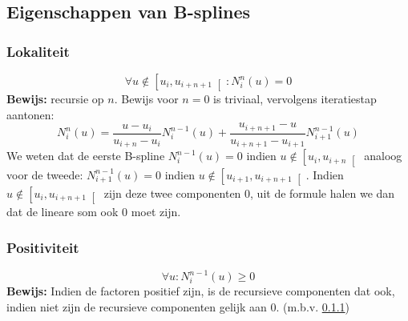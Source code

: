 \documentclass[a4paper,titlepage]{article}
\newcommand{\brak}[1]{\left(#1\right)}
\newcommand{\rinva}[1]{\left[#1\right[}
\begin{document}
\subsection{Eigenschappen van B-splines}
\subsubsection{Lokaliteit}
\label{subsec:splinLok}
\begin{equation}
\forall u\notin\rinva{u_i,u_{i+n+1}}:N_i^n\brak{u}=0
\end{equation}
\textbf{Bewijs: } recursie op $n$. Bewijs voor $n=0$ is triviaal, vervolgens iteratiestap aantonen:
\begin{equation}
N_i^n\brak{u}=\displaystyle\frac{u-u_i}{u_{i+n}-u_i}N_i^{n-1}\brak{u}+\displaystyle\frac{u_{i+n+1}-u}{u_{i+n+1}-u_{i+1}}N_{i+1}^{n-1}\brak{u}
\end{equation}
We weten dat de eerste B-spline $N_i^{n-1}\brak{u}=0$ indien $u\notin\rinva{u_i,u_{i+n}}$ analoog voor de tweede: $N_{i+1}^{n-1}\brak{u}=0$ indien $u\notin\rinva{u_{i+1},u_{i+n+1}}$. Indien $u\notin\rinva{u_i,u_{i+n+1}}$ zijn deze twee componenten $0$, uit de formule halen we dan dat de lineare som ook $0$ moet zijn.
\subsubsection{Positiviteit}
\begin{equation}
\forall u:N_i^{n-1}\brak{u}\geq0
\end{equation}
\textbf{Bewijs: } Indien de factoren positief zijn, is de recursieve componenten dat ook, indien niet zijn de recursieve componenten gelijk aan $0$. (m.b.v. \ref{subsec:splinLok})
\end{document}
